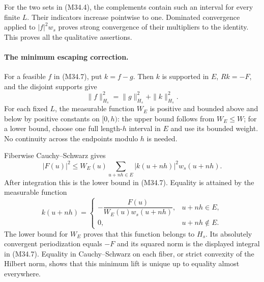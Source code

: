 For the two sets in (M34.4), the complements contain such
an interval for every finite $L$.  Their indicators increase
pointwise to one.  Dominated convergence applied to
$|f|^2w_s$ proves strong convergence of their multipliers
to the identity.  This proves all the qualitative assertions.

\paragraph{The minimum escaping correction.}
For a feasible $f$ in (M34.7), put $k=f-g$.  Then $k$ is
supported in $E$, $Rk=-F$, and the disjoint supports give
\[
                       \|f\|_{H_s}^2=\|g\|_{H_s}^2+
                                                    \|k\|_{H_s}^2.
 \tag{M34.13}
\]
For each fixed $L$, the measurable function $W_E$ is
positive and bounded above and below by positive constants
on $[0,h)$: the upper bound follows from $W_E\le W$;
for a lower bound, choose one full length-$h$ interval
in $E$ and use its bounded weight.  No continuity across
the endpoints modulo $h$ is needed.

Fiberwise Cauchy--Schwarz gives
\[
 |F(u)|^2\le W_E(u)
         \sum_{u+nh\in E}|k(u+nh)|^2w_s(u+nh).
 \tag{M34.14}
\]
After integration this is the lower bound in (M34.7).
Equality is attained by the measurable function
\[
 k(u+nh)=
 \begin{cases}
 -\dfrac{F(u)}{W_E(u)w_s(u+nh)},&u+nh\in E,\\[6pt]
 0,&u+nh\notin E.
 \end{cases}
 \tag{M34.15}
\]
The lower bound for $W_E$ proves that this function belongs
to $H_s$.  Its absolutely convergent periodization equals
$-F$ and its squared norm is the displayed integral in
(M34.7).  Equality in Cauchy--Schwarz on each fiber, or
strict convexity of the Hilbert norm, shows that this
minimum lift is unique up to equality almost everywhere.

